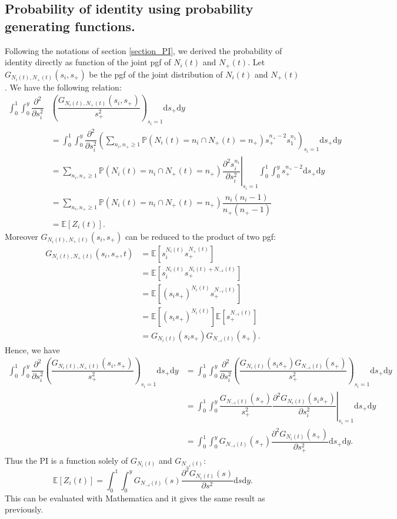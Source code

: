 \documentclass{article}
\newcommand{\ud}{{\mathrm{d}}}
\newcommand{\pr}{{\mathbb{P}}}
\begin{document}
 \subsection{Probability of identity using probability generating functions.}
 \label{subsection_pgf}
 Following the notations of section \ref{section_PI}, we derived the probability of identity directly as function of the joint pgf of $N_i(t)$ and $N_+(t)$.
 Let $G_{N_i(t) ,N_+(t)}(s_i,s_+)$ be the pgf of the joint distribution of $N_i(t)$ and $N_+(t)$. We have the following relation:
 \begin{align}
 \displaystyle \int_0^1 \int_0^y \dfrac{\partial^2 }{\partial s_i^2} & \left( \dfrac{G_{N_i(t) ,N_+(t)}(s_i,s_+)}{s_+^2} \right)_{s_i =1} \ud s_+ \ud y \\
 &= \int_0^1 \int_0^y \dfrac{\partial^2 }{\partial s_i^2} \left( \sum_{n_i,n_+ \geq 1} \pr(N_i(t)=n_i \cap N_+(t)=n_+) s_+^{n_+ -2} s_1^{n_1} \right)_{s_i =1} \ud s_+ \ud y \\ 
 &= \sum_{n_i,n_+ \geq 1} \pr(N_i(t)=n_i \cap N_+(t)=n_+) \left.  \dfrac{\partial^2 s_i^{n_i}}{\partial s_i^2} \right\vert_{s_i=1} \int_0^1 \int_0^y s_+^{n_+-2} \ud s_+ \ud y\\
 &= \sum_{n_i  ,n_+ \geq 1} \pr(N_i(t)=n_i \cap N_+(t)=n_+) \dfrac{n_i(n_i-1)}{n_+(n_+-1)}\\
 &= \mathbb{E}\left[ Z_i(t) \right].
 \end{align}
 Moreover $G_{N_i(t) ,N_+(t)}(s_i,s_+)$ can be reduced to the product of two pgf: 
  \begin{align}
G_{N_i(t) ,N_+(t)}(s_i,s_+,t) &= \mathbb{E} [ s_i^{N_i(t)} s_+^{N_+(t)}] \\
		&= \mathbb{E} [ s_i^{N_i(t)} s_+^{N_i(t)+N_{-i}(t)}]\\
		&= \mathbb{E} [ (s_i s_+)^{N_i(t)} s_+^{N_{-i}(t)}] \\
		&= \mathbb{E} [ (s_i s_+)^{N_i(t)} ]\mathbb{E} [ s_+^{N_{-i}(t)}] \\
		&= G_{N_i(t)}(s_i s_+) G_{N_{-i}(t)}(s_+).
 \end{align}
 Hence, we have 
   \begin{align}
\displaystyle \int_0^1 \int_0^y \dfrac{\partial^2 }{\partial s_i^2} \left( \dfrac{G_{N_i(t) ,N_+(t)}(s_i,s_+)}{s_+^2} \right)_{s_i =1} \ud s_+ \ud y
 &= \int_0^1 \int_0^y \dfrac{\partial^2 }{\partial s_i^2} \left( \dfrac{ G_{N_i(t)}(s_i s_+) G_{N_{-i}(t)}(s_+)}{s_+^2} \right)_{s_i =1} \ud s_+ \ud y \\
  &= \int_0^1 \int_0^y \dfrac{G_{N_{-i}(t)}(s_+)}{s_+^2} \left. \dfrac{\partial^2  G_{N_i(t)}(s_i s_+)  }{\partial s_i^2} \right\vert_{s_i =1} \ud s_+ \ud y \\
    &= \int_0^1 \int_0^y G_{N_{-i}(t)}(s_+) \dfrac{\partial^2  G_{N_i(t)}(s_+)  }{\partial s_+^2} \ud s_+ \ud y.
 \end{align}
 Thus the PI is a function solely of $G_{N_{i}(t)}$ and $G_{N_{-i}(t)}$:
 \begin{equation}
 \displaystyle \mathbb{E}\left[ Z_i(t) \right]= \int_0^1 \int_0^y G_{N_{-i}(t)}(s) \dfrac{\partial^2 G_{N_i(t)}(s)}{\partial s^2} \ud s \ud y.
 \end{equation}
This can be evaluated with Mathematica and it gives the same result as previously.


\end{document}
